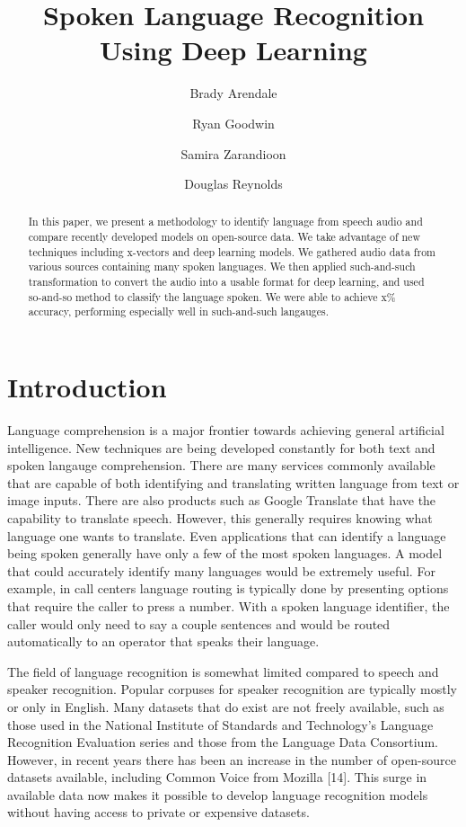 \documentclass{llncs}
\title{Spoken Language Recognition Using Deep Learning}
\author{
Brady Arendale \inst{1,} \and
Ryan Goodwin \inst{1} \and
Samira Zarandioon \inst{1} \and
Douglas Reynolds \inst{2}
}
\institute{
Master of Science in Data Science, Southern Methodist University,
Dallas TX 75275 USA
\email{\{barendale,rgoodwin,szarandioon\}@smu.edu} \and
MIT Lincoln Laboratory, Lexington MA USA
\email{dar@ll.mit.edu}
}
\begin{document}
\maketitle

\begin{abstract}
In this paper, we present a methodology to identify language from speech audio and compare recently developed models on open-source data. We take advantage of new techniques including x-vectors and deep learning models. We gathered audio data from various sources containing many spoken languages. We then applied such-and-such transformation to convert the audio into a usable format for deep learning, and used so-and-so method to classify the language spoken. We were able to achieve x\% accuracy, performing especially well in such-and-such langauges.
\end{abstract}

\section{Introduction}

Language comprehension is a major frontier towards achieving general artificial intelligence. New techniques are being developed constantly for both text and spoken langauge comprehension. There are many services commonly available that are capable of both identifying and translating written language from text or image inputs. There are also products such as Google Translate that have the capability to translate speech. However, this generally requires knowing what language one wants to translate. Even applications that can identify a language being spoken generally have only a few of the most spoken languages. A model that could accurately identify many languages would be extremely useful. For example, in call centers language routing is typically done by presenting options that require the caller to press a number. With a spoken language identifier, the caller would only need to say a couple sentences and would be routed automatically to an operator that speaks their language.

The field of language recognition is somewhat limited compared to speech and speaker recognition. Popular corpuses for speaker recognition are typically mostly or only in English. Many datasets that do exist are not freely available, such as those used in the National Institute of Standards and Technology's Language Recognition Evaluation series and those from the Language Data Consortium. However, in recent years there has been an increase in the number of open-source datasets available, including Common Voice from Mozilla [14]. This surge in available data now makes it possible to develop language recognition models without having access to private or expensive datasets.
\end{document}
